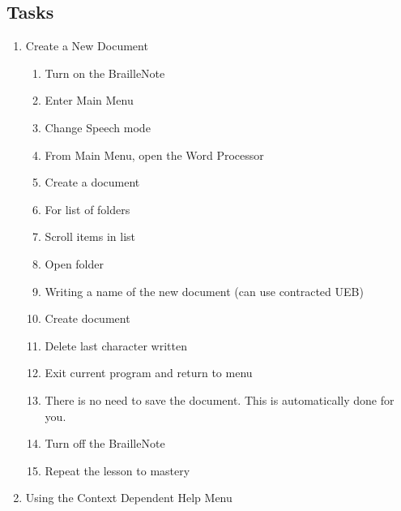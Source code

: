 \documentclass[10pt,letterpaper,twoside]{report}
\begin{document}
\subsection{Tasks}
\begin{enumerate}
	\item Create a New Document
	      \begin{enumerate}
		      \item Turn on the BrailleNote 
		      \item Enter Main Menu 
		      \item Change Speech mode 
		      \item From Main Menu, open the Word Processor 
		      \item Create a document 
		      \item For list of folders 
		      \item Scroll items in list 
		      \item Open folder 
		      \item Writing a name of the new document (can use contracted UEB)
		      \item Create document 
		      \item Delete last character written 
		      \item Exit current program and return to menu 
		      \item There is no need to save the document. This is automatically done for you.
		      \item Turn off the BrailleNote 
		      \item Repeat the lesson to mastery
	      \end{enumerate}
	\item Using the Context Dependent Help Menu

\end{enumerate}
\end{document}
